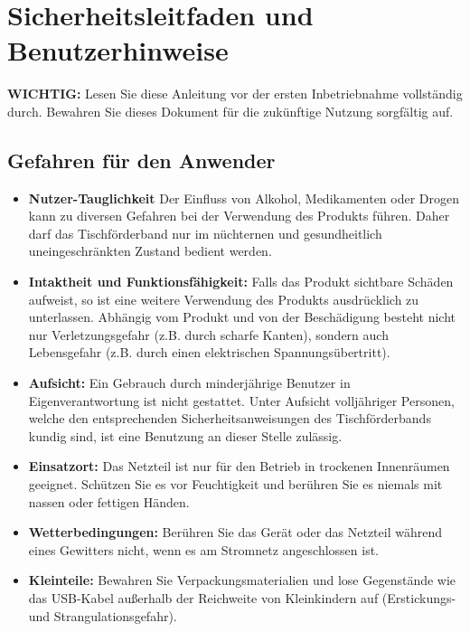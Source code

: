 %
%
%


\chapter{Sicherheitsleitfaden und Benutzerhinweise}
\textbf{WICHTIG:} Lesen Sie diese Anleitung vor der ersten Inbetriebnahme vollständig durch. Bewahren Sie dieses Dokument für die zukünftige Nutzung sorgfältig auf.

\section{Gefahren für den Anwender}
\begin{itemize}
	\item \textbf {Nutzer-Tauglichkeit}
	Der Einfluss von Alkohol, Medikamenten oder Drogen kann zu diversen Gefahren bei der Verwendung des Produkts führen. Daher darf das Tischförderband nur im nüchternen und gesundheitlich uneingeschränkten Zustand bedient werden.
	\item \textbf {Intaktheit und Funktionsfähigkeit:} 
	Falls das Produkt sichtbare Schäden aufweist, so ist eine weitere Verwendung des Produkts ausdrücklich zu unterlassen. Abhängig vom Produkt und von der Beschädigung besteht nicht nur Verletzungsgefahr (z.B. durch scharfe Kanten), sondern auch Lebensgefahr (z.B. durch einen elektrischen Spannungsübertritt).
	\item \textbf {Aufsicht:}
	Ein Gebrauch durch minderjährige Benutzer in Eigenverantwortung ist nicht gestattet. Unter Aufsicht volljähriger Personen, welche den entsprechenden Sicherheitsanweisungen des Tischförderbands kundig sind, ist eine Benutzung an dieser Stelle zulässig.
	\item \textbf {Einsatzort:}
	Das Netzteil ist nur für den Betrieb in trockenen Innenräumen geeignet. Schützen Sie es vor Feuchtigkeit und berühren Sie es niemals mit nassen oder fettigen Händen.
	\item \textbf {Wetterbedingungen:}
	Berühren Sie das Gerät oder das Netzteil während eines Gewitters nicht, wenn es am Stromnetz angeschlossen ist.
	\item \textbf {Kleinteile:}
	Bewahren Sie Verpackungsmaterialien und lose Gegenstände wie das USB-Kabel außerhalb der Reichweite von Kleinkindern auf (Erstickungs- und Strangulationsgefahr).
\end{itemize}

